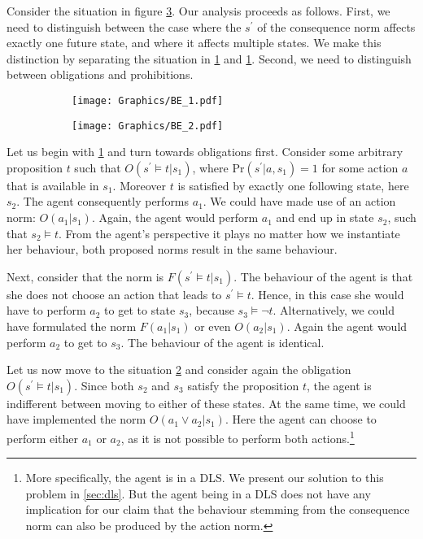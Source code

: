 Consider the situation in figure \ref{fig:behaviouralequivalence}. Our analysis proceeds as follows. First, we need to distinguish between the case where the $s^{\prime}$ of the consequence norm affects exactly one future state, and where it affects multiple states. We make this distinction by separating the situation in \ref{fig:BE_1} and \ref{fig:BE_1}. Second, we need to distinguish between obligations and prohibitions.

\begin{figure}[h!]
    \centering
    \begin{subfigure}[]{0.3\textwidth}
        \texttt{[image: Graphics/BE\_1.pdf]}
        \caption{}
        \label{fig:BE_1}
    \end{subfigure}
    \qquad %
    \begin{subfigure}[]{0.3\textwidth}
        \texttt{[image: Graphics/BE\_2.pdf]}
        \caption{}
        \label{fig:BE_2}
    \end{subfigure}
    \caption{}
    \label{fig:behaviouralequivalence}
\end{figure}  

Let us begin with \ref{fig:BE_1} and turn towards obligations first. Consider some arbitrary proposition $t$ such that $O(s^{\prime} \vDash t | s_1)$, where Pr$(s^{\prime}| a, s_1) = 1$ for some action $a$ that is available in $s_1$. Moreover $t$ is satisfied by exactly one following state, here $s_2$. The agent consequently performs $a_1$. We could have made use of an action norm: $O( a_1 | s_1)$. Again, the agent would perform $a_1$ and end up in state $s_2$, such that $s_2 \vDash t$. From the agent's perspective it plays no matter how we instantiate her behaviour, both proposed norms result in the same behaviour. 

Next, consider that the norm is $F(s^{\prime} \vDash t | s_1)$. The behaviour of the agent is that she does not choose an action that leads to $s^{\prime} \vDash t$. Hence, in this case she would have to perform $a_2$ to get to state $s_3$, because $s_3 \vDash \neg t$. Alternatively, we could have formulated the norm $F(a_1 | s_1)$ or even $O(a_2 | s_1)$. Again the agent would perform $a_2$ to get to $s_3$. The behaviour of the agent is identical.

Let us now move to the situation \ref{fig:BE_2} and consider again the obligation $O(s^{\prime} \vDash t | s_1)$. Since both $s_2$ and $s_3$ satisfy the proposition $t$, the agent is indifferent between moving to either of these states. At the same time, we could have implemented the norm $O(a_1 \vee a_2 | s_1)$. Here the agent can choose to perform either $a_1$ or $a_2$, as it is not possible to perform both actions.\footnote{More specifically, the agent is in a DLS. We present our solution to this problem in \ref{sec:dls}. But the agent being in a DLS does not have any implication for our claim that the behaviour stemming from the consequence norm can also be produced by the action norm.} 

